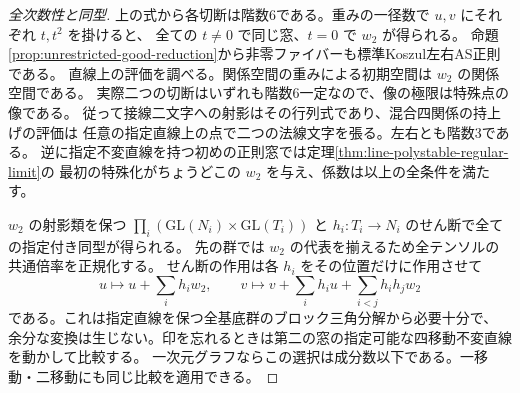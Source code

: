 \begin{proof}[全次数性と同型]
上の式から各切断は階数6である。重みの一径数で $u,v$ にそれぞれ $t,t^2$ を掛けると、
全ての $t\ne0$ で同じ窓、$t=0$ で $w_2$ が得られる。
命題\ref{prop:unrestricted-good-reduction}から非零ファイバーも標準Koszul左右AS正則である。
直線上の評価を調べる。関係空間の重みによる初期空間は $w_2$ の関係空間である。
実際二つの切断はいずれも階数6一定なので、像の極限は特殊点の像である。
従って接線二文字への射影はその行列式であり、混合四関係の持上げの評価は
任意の指定直線上の点で二つの法線文字を張る。左右とも階数3である。
逆に指定不変直線を持つ初めの正則窓では定理\ref{thm:line-polystable-regular-limit}の
最初の特殊化がちょうどこの $w_2$ を与え、係数は以上の全条件を満たす。

$w_2$ の射影類を保つ $\prod_i(\mathrm{GL}(N_i)\times\mathrm{GL}(T_i))$ と
$h_i:T_i\to N_i$ のせん断で全ての指定付き同型が得られる。
先の群では $w_2$ の代表を揃えるため全テンソルの共通倍率を正規化する。
せん断の作用は各 $h_i$ をその位置だけに作用させて
\[
 u\mapsto u+\textstyle\sum_i h_iw_2,\qquad
 v\mapsto v+\textstyle\sum_i h_i u+\sum_{i<j}h_i h_j w_2
\]
である。これは指定直線を保つ全基底群のブロック三角分解から必要十分で、
余分な変換は生じない。印を忘れるときは第二の窓の指定可能な四移動不変直線を動かして比較する。
一次元グラフならこの選択は成分数以下である。一移動・二移動にも同じ比較を適用できる。
\end{proof}
